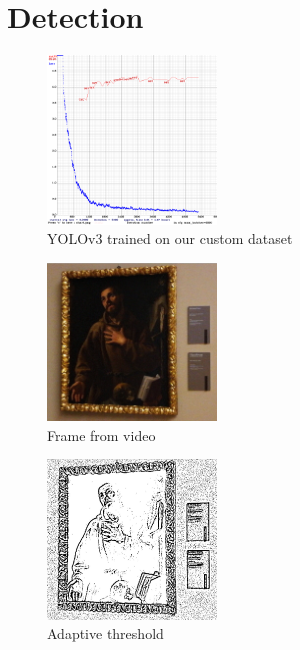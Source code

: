 \section{Detection}

\begin{figure}[h!]
    \centering
        \includegraphics[width=0.4\textwidth]{pictures/painting_detection/training-v3.png}
    \caption{YOLOv3 trained on our custom dataset}
    \label{fig:training-v3}
\end{figure} 

\begin{figure}[]
    \centering
        \includegraphics[width=0.4\textwidth]{pictures/painting_detection/Frame2.jpg}
    \caption{Frame from video}
    \label{fig:a}
\end{figure}

\begin{figure}[]
    \centering
        \includegraphics[width=0.4\textwidth]{pictures/painting_detection/Adaptive_threshold.jpg}
    \caption{Adaptive threshold}
    \label{fig:b}
\end{figure}

